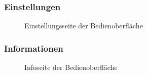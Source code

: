 \subsubsection{Einstellungen}
\begin{figure}[h]
    \caption{Einstellungsseite der Bedienoberfläche}
\end{figure}
\newpage

\subsubsection{Informationen}
\begin{figure}[h]
    \caption{Infoseite der Bedienoberfläche}
\end{figure}
\newpage